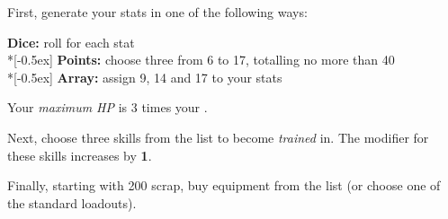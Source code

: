 
First, generate your stats in one of the following ways:

\textbf{Dice:} roll  for each stat \\*[-0.5ex]
\textbf{Points:} choose three from 6 to 17, totalling no more than 40 \\*[-0.5ex]
\textbf{Array:} assign 9, 14 and 17 to your stats

Your \emph{maximum HP} is 3 times your .

Next, choose three skills from the list to become \emph{trained} in. The modifier for these skills increases by \textbf{1}.

Finally, starting with 200 scrap, buy equipment from the list (or choose one of the standard loadouts).
